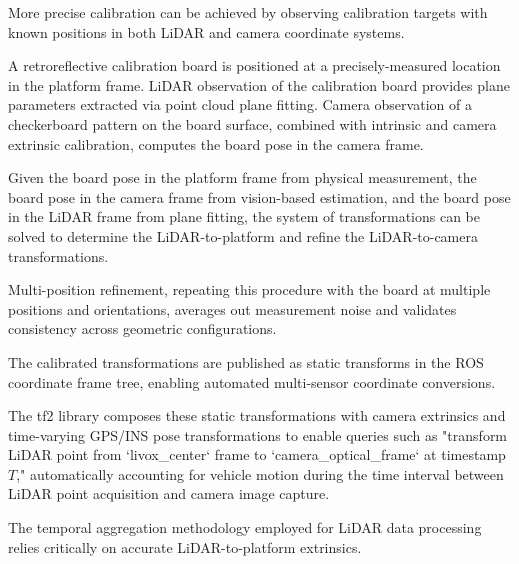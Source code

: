 
More precise calibration can be achieved by observing calibration targets with known positions in both LiDAR and camera coordinate systems.

A retroreflective calibration board is positioned at a precisely-measured location in the platform frame.
LiDAR observation of the calibration board provides plane parameters extracted via point cloud plane fitting.
Camera observation of a checkerboard pattern on the board surface, combined with intrinsic and camera extrinsic calibration, computes the board pose in the camera frame.

Given the board pose in the platform frame from physical measurement, the board pose in the camera frame from vision-based estimation, and the board pose in the LiDAR frame from plane fitting, the system of transformations can be solved to determine the LiDAR-to-platform and refine the LiDAR-to-camera transformations.

Multi-position refinement, repeating this procedure with the board at multiple positions and orientations, averages out measurement noise and validates consistency across geometric configurations.


The calibrated transformations are published as static transforms in the ROS coordinate frame tree, enabling automated multi-sensor coordinate conversions.


The tf2 library composes these static transformations with camera extrinsics and time-varying GPS/INS pose transformations to enable queries such as "transform LiDAR point from `livox\_center` frame to `camera\_optical\_frame` at timestamp $T$," automatically accounting for vehicle motion during the time interval between LiDAR point acquisition and camera image capture.


The temporal aggregation methodology employed for LiDAR data processing relies critically on accurate LiDAR-to-platform extrinsics.

